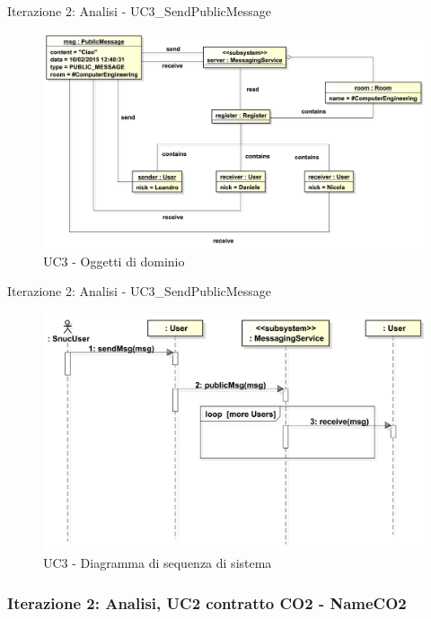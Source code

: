 \documentclass[t]{beamer} %
\begin{document}
\begin{frame} {Iterazione 2: Analisi - UC3\_SendPublicMessage}
   \begin{figure}
     \includegraphics[scale=0.315]{image_astah/Iteration_2_DomainModel/UC3_SendPublicMessage_OM.png}{\centering}
     \caption{UC3 - Oggetti di dominio}
     \label{fig_UC3_SPM_OM} 
   \end{figure}
\end{frame}

\begin{frame} {Iterazione 2: Analisi - UC3\_SendPublicMessage}
   \begin{figure}
     \includegraphics[scale=0.33]{image_astah/Iteration_2_DomainModel/UC3_SendPublicMessage_SSD.png}{\centering}
     \caption{UC3 - Diagramma di sequenza di sistema}
     \label{fig_UC3_SPM_SSD} 
   \end{figure}
\end{frame}

\begin{frame}
 \frametitle{Iterazione 2: Analisi, UC2 contratto CO2 - NameCO2}
  \begin{table}[!htbp]
   \caption {UC2 Contratto CO2 - NameCO2}
    \label{table:1}
   \end{table}
\end{frame}
\end{document}
